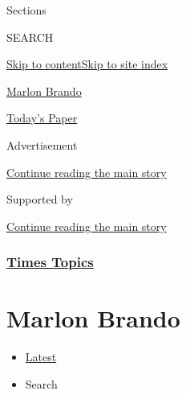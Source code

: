 Sections

SEARCH

\protect\hyperlink{site-content}{Skip to
content}\protect\hyperlink{site-index}{Skip to site index}

\href{https://www.nytimes3xbfgragh.onion/topic/person/marlon-brando}{Marlon
Brando}

\href{https://myaccount.nytimes3xbfgragh.onion/auth/login?response_type=cookie\&client_id=vi}{}

\href{https://www.nytimes3xbfgragh.onion/section/todayspaper}{Today's
Paper}

Advertisement

\protect\hyperlink{after-top}{Continue reading the main story}

Supported by

\protect\hyperlink{after-sponsor}{Continue reading the main story}

\hypertarget{times-topics}{%
\subsubsection{\texorpdfstring{\href{/index.html}{Times
Topics}}{Times Topics}}\label{times-topics}}

\hypertarget{marlon-brando}{%
\section{Marlon Brando}\label{marlon-brando}}

\begin{itemize}
\tightlist
\item
  \protect\hyperlink{stream-panel}{Latest}
\item
  Search
\end{itemize}

